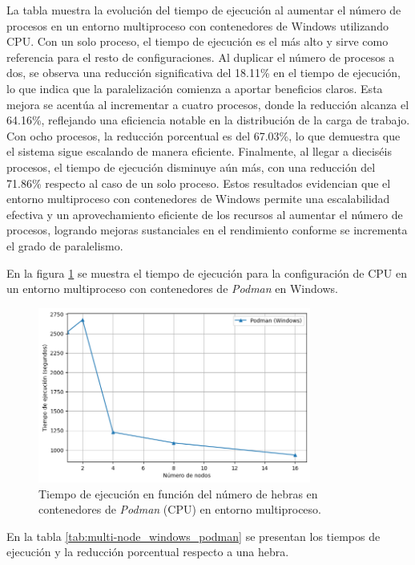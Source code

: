 La tabla muestra la evolución del tiempo de ejecución al aumentar el número de procesos en un entorno multiproceso con contenedores de Windows utilizando CPU. Con un solo proceso, el tiempo de ejecución es el más alto y sirve como referencia para el resto de configuraciones. Al duplicar el número de procesos a dos, se observa una reducción significativa del 18.11\% en el tiempo de ejecución, lo que indica que la paralelización comienza a aportar beneficios claros. Esta mejora se acentúa al incrementar a cuatro procesos, donde la reducción alcanza el 64.16\%, reflejando una eficiencia notable en la distribución de la carga de trabajo. Con ocho procesos, la reducción porcentual es del 67.03\%, lo que demuestra que el sistema sigue escalando de manera eficiente. Finalmente, al llegar a dieciséis procesos, el tiempo de ejecución disminuye aún más, con una reducción del 71.86\% respecto al caso de un solo proceso. Estos resultados evidencian que el entorno multiproceso con contenedores de Windows permite una escalabilidad efectiva y un aprovechamiento eficiente de los recursos al aumentar el número de procesos, logrando mejoras sustanciales en el rendimiento conforme se incrementa el grado de paralelismo.

En la figura \ref{fig:multi-node_windows_podman_time} se muestra el tiempo de ejecución para la configuración de CPU en un entorno multiproceso con contenedores de \textit{Podman} en Windows.

\begin{figure}[H]
    \centering
    \includegraphics[width=0.8\textwidth]{imagenes/cap5/multi-node_windows_podman_time.png}
    \caption{Tiempo de ejecución en función del número de hebras en contenedores de \textit{Podman} (CPU) en entorno multiproceso.}
    \label{fig:multi-node_windows_podman_time}
\end{figure}

En la tabla \ref{tab:multi-node_windows_podman} se presentan los tiempos de ejecución y la reducción porcentual respecto a una hebra.

